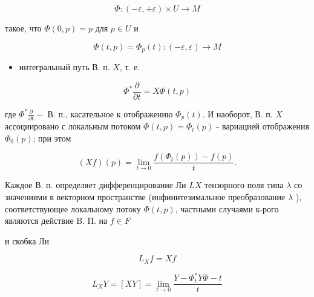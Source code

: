 \documentclass[10pt]{article}
\begin{document}
\[

\Phi:(-\varepsilon,+\varepsilon) \times U \longrightarrow M

\]



такое, что $\Phi(0, p)=p$ для $p \in U$ и



\[

\Phi(t, p)=\Phi_{p}(t):(-\varepsilon, \varepsilon) \rightarrow M

\]



\begin{itemize}

  \item интегральный путь В. п. $X$, т. е.

\end{itemize}



\[

\Phi^{*} \frac{\partial}{\partial t}=X \Phi(t, p)

\]



где $\Phi^{*} \frac{\partial}{\partial t}-$ В. п., касательное к отображению $\Phi_{p}(t)$. И наоборот, В. п. $X$ ассоциировано с локальным потоком $\Phi(t, p)=\Phi_{t}(p)$ - вариацией отображения $\Phi_{0}(p)$; при этом



\[

(X f)(p)=\lim _{t \rightarrow 0} \frac{f\left(\Phi_{t}(p)\right)-f(p)}{t} .

\]



Каждое В. п. определяет дифференцирование Ли $L X$ тензорного поля типа $\lambda$ со значениями в векторном пространстве (инфинитезимальное преобразование $\lambda$ ), соответствующее локальному потоку $\Phi(t, p)$, частными случаями к-рого являются действие B. П. на $f \in F$



и скобка Ли



\[

L_{X} f=X f

\]



\[

L_{X} Y=[X Y]=\lim _{t \rightarrow 0} \frac{Y-\Phi_{t}^{*} Y \Phi-t}{t}

\]
\end{document}
